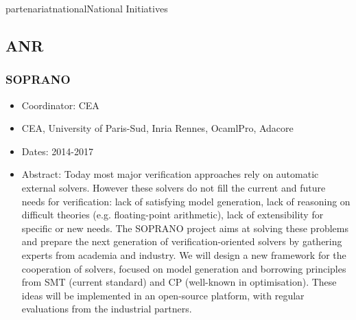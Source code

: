 \documentclass{ra2018}
\begin{document}
 \begin{module}{partenariat}{national}{National Initiatives}


 \subsection{ANR}


\subsubsection*{\label{project:soprano}SOPRANO}
\begin{itemize}
	\item Coordinator: CEA
	\item CEA, University of Paris-Sud, Inria Rennes, OcamlPro, Adacore
	\item Dates: 2014-2017
	\item Abstract:  Today most major verification
    approaches rely on automatic external
    solvers. However these solvers do not fill the current and
    future needs for verification: lack of satisfying model
    generation, lack of reasoning on difficult theories
    (e.g. floating-point arithmetic), lack of extensibility for
    specific or new needs. The SOPRANO
    project aims at solving these problems and prepare the next generation of verification-oriented
    solvers by gathering experts
    from academia and industry.
     We will design a new framework for the cooperation of
    solvers, focused on model generation and borrowing principles from
    SMT (current standard) and CP (well-known in optimisation).
    These ideas will be implemented in an open-source platform, with regular evaluations
    from the industrial partners.
\end{itemize}


\end{module}
\end{document}
